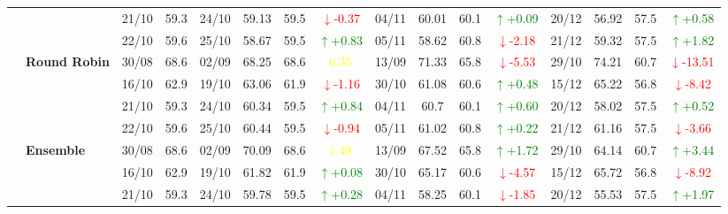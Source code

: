 \documentclass{ieeeaccess}
\begin{document}
{\begin{longtable}{llcc|cccc|cccc|cccc}
&
& 21/10 & 59.3 & 24/10 & 59.13 & 59.5 & \textcolor{red}{\(\downarrow\)-0.37} & 04/11 & 60.01 & 60.1 & \textcolor{green}{\(\uparrow\)+0.09} & 20/12 & 56.92 & 57.5 & \textcolor{green}{\(\uparrow\)+0.58} \\

&
& 22/10 & 59.6 & 25/10 & 58.67 & 59.5 & \textcolor{green}{\(\uparrow\)+0.83} & 05/11 & 58.62 & 60.8 & \textcolor{red}{\(\downarrow\)-2.18} & 21/12 & 59.32 & 57.5 & \textcolor{green}{\(\uparrow\)+1.82} \\
\cmidrule(lr){2-16}


& \textbf{Round Robin}
& 30/08 & 68.6 & 02/09 & 68.25 & 68.6 & \textcolor{yellow}{0.35} & 13/09 & 71.33 & 65.8 & \textcolor{red}{\(\downarrow\)-5.53} & 29/10 & 74.21 & 60.7 & \textcolor{red}{\(\downarrow\)-13.51} \\

&
& 16/10 & 62.9 & 19/10 & 63.06 & 61.9 & \textcolor{red}{\(\downarrow\)-1.16} & 30/10 & 61.08 & 60.6 & \textcolor{green}{\(\uparrow\)+0.48} & 15/12 & 65.22 & 56.8 & \textcolor{red}{\(\downarrow\)-8.42} \\

&
& 21/10 & 59.3 & 24/10 & 60.34 & 59.5 & \textcolor{green}{\(\uparrow\)+0.84} & 04/11 & 60.7 & 60.1 & \textcolor{green}{\(\uparrow\)+0.60} & 20/12 & 58.02 & 57.5 & \textcolor{green}{\(\uparrow\)+0.52} \\

&
& 22/10 & 59.6 & 25/10 & 60.44 & 59.5 & \textcolor{red}{\(\downarrow\)-0.94} & 05/11 & 61.02 & 60.8 & \textcolor{green}{\(\uparrow\)+0.22} & 21/12 & 61.16 & 57.5 & \textcolor{red}{\(\downarrow\)-3.66} \\
\cmidrule(lr){2-16}

& \textbf{Ensemble}
& 30/08 & 68.6 & 02/09 & 70.09 & 68.6 & \textcolor{yellow}{1.49} & 13/09 & 67.52 & 65.8 & \textcolor{green}{\(\uparrow\)+1.72} & 29/10 & 64.14 & 60.7 & \textcolor{green}{\(\uparrow\)+3.44} \\

&
& 16/10 & 62.9 & 19/10 & 61.82 & 61.9 & \textcolor{green}{\(\uparrow\)+0.08} & 30/10 & 65.17 & 60.6 & \textcolor{red}{\(\downarrow\)-4.57} & 15/12 & 65.72 & 56.8 & \textcolor{red}{\(\downarrow\)-8.92} \\

&
& 21/10 & 59.3 & 24/10 & 59.78 & 59.5 & \textcolor{green}{\(\uparrow\)+0.28} & 04/11 & 58.25 & 60.1 & \textcolor{red}{\(\downarrow\)-1.85} & 20/12 & 55.53 & 57.5 & \textcolor{green}{\(\uparrow\)+1.97} \\


\end{longtable}}
\end{document}
